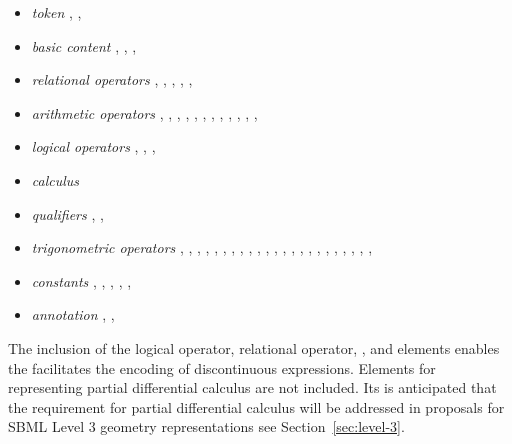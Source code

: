 \documentclass[10pt]{cekarticle}
\begin{document}
\begin{itemize}

\item \emph{token} , , 

\item \emph{basic content} , ,
, 

\item \emph{relational operators}
            , , , , , 

\item \emph{arithmetic operators}
            , , ,
            , , ,
            , , , ,
            , , 

\item \emph{logical operators}
            , , , 

\item \emph{calculus}

\item \emph{qualifiers}
            , , 

\item \emph{trigonometric operators}
            , , , ,
            , , , ,
            , , ,
            , , ,
            , , , ,
            , , ,
            , , 

\item \emph{constants}
            , , ,
            , , 

\item \emph{annotation}
            , ,
\end{itemize}

The inclusion of the logical operator, relational operator, ,  and  elements enables the facilitates the encoding of discontinuous expressions.  Elements for representing partial differential calculus are not included.  Its is anticipated that the requirement for partial differential calculus will be addressed in proposals for SBML Level 3 geometry representations see Section~\ref{sec:level-3}.
\end{document}
